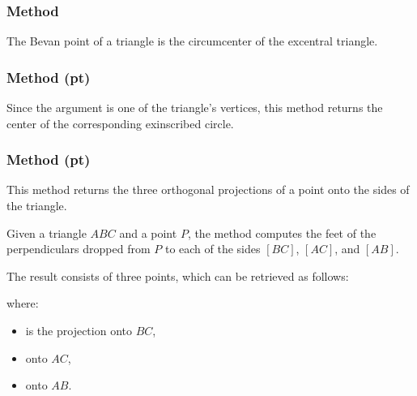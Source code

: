\subsubsection{Method }
\label{ssub:method_imeth_triangle_bevan_point}
The Bevan point of a triangle  is the circumcenter of the excentral triangle.

\begin{tkzexample}[latex=.5\textwidth]
\end{tkzexample}

\subsubsection{Method (pt)}
\label{ssub:method_triangle_excenter_pt}
Since the argument is one of the triangle's vertices, this method returns the center of the corresponding exinscribed circle.

\subsubsection{Method (pt)}
\label{ssub:method_triangle_projections_pt}

This method returns the three orthogonal projections of a point onto the sides of the triangle.

\medskip

Given a triangle $ABC$ and a point $P$, the method computes the feet of the perpendiculars dropped from $P$ to each of the sides $[BC]$, $[AC]$, and $[AB]$.

\medskip

The result consists of three points, which can be retrieved as follows:
\begin{mybox}
\end{mybox}
where:
\begin{itemize}
  \item {} is the projection onto $BC$,
  \item {} onto $AC$,
  \item {} onto $AB$.
\end{itemize}


